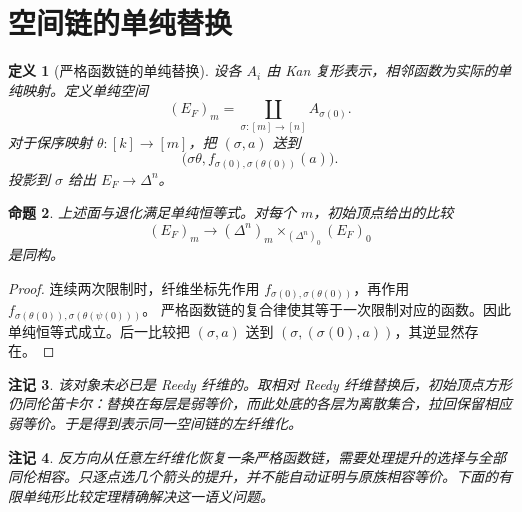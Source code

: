 \documentclass[12pt,oneside,openany,fontset=none]{ctexbook}
\theoremstyle{cn}
\newtheorem{definition}{定义}[chapter]
\newtheorem{proposition}[definition]{命题}
\newtheorem{remark}[definition]{注记}
\numberwithin{equation}{chapter}
\begin{document}
\section{空间链的单纯替换}
\begin{definition}[严格函数链的单纯替换]
设各 $A_i$ 由 Kan 复形表示，相邻函数为实际的单纯映射。定义单纯空间
\[
(E_F)_m=\coprod_{\sigma:[m]\to[n]}A_{\sigma(0)}.
\]
对于保序映射 $\theta:[k]\to[m]$，把 $(\sigma,a)$ 送到
\[
\bigl(\sigma\theta,
 f_{\sigma(0),\sigma(\theta(0))}(a)\bigr).
\]
投影到 $\sigma$ 给出 $E_F\to\Delta^n$。
\end{definition}
\begin{proposition}
上述面与退化满足单纯恒等式。对每个 $m$，初始顶点给出的比较
\[
(E_F)_m\longrightarrow
(\Delta^n)_m\times_{(\Delta^n)_0}(E_F)_0
\]
是同构。
\end{proposition}
\begin{proof}
连续两次限制时，纤维坐标先作用
$f_{\sigma(0),\sigma(\theta(0))}$，再作用
$f_{\sigma(\theta(0)),\sigma(\theta(\psi(0)))}$。
严格函数链的复合律使其等于一次限制对应的函数。因此单纯恒等式成立。后一比较把 $(\sigma,a)$ 送到 $(\sigma,(\sigma(0),a))$，其逆显然存在。
\end{proof}
\begin{remark}
该对象未必已是 Reedy 纤维的。取相对 Reedy 纤维替换后，初始顶点方形仍同伦笛卡尔：替换在每层是弱等价，而此处底的各层为离散集合，拉回保留相应弱等价。于是得到表示同一空间链的左纤维化。
\end{remark}
\begin{remark}
反方向从任意左纤维化恢复一条严格函数链，需要处理提升的选择与全部同伦相容。只逐点选几个箭头的提升，并不能自动证明与原族相容等价。下面的有限单纯形比较定理精确解决这一语义问题。
\end{remark}
\end{document}

